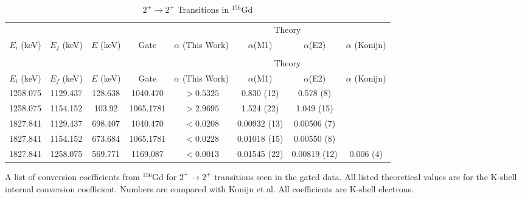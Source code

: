 \begin{landscape}
    \begin{longtable}{c|c|c|c|c|c|c|c}
        \caption{$2^+\rightarrow 2^+$ Transitions in $^{156}$Gd}
        \label{tab:156Gd_2_to_2}\\
        \toprule
        &	& 	&  &	& \multicolumn{2}{c|}{Theory}	& 	\\
        $E_i$ (keV)	&	$E_f$ (keV)	& $E$ (keV)	&	Gate &		$\alpha$ (This Work)	& $\alpha$(M1) & $\alpha$(E2) &	$\alpha$ (Konijn)	\\
        \hline
        \endfirsthead
        \toprule
        \caption[]{$2^+\rightarrow 2^+$ Transitions in $^{156}$Gd}\\
        &	& 	&  &	& \multicolumn{2}{c|}{Theory}	& 	\\
        $E_i$ (keV)	&	$E_f$ (keV)	& $E$ (keV)	&	Gate &		$\alpha$ (This Work)	& $\alpha$(M1) & $\alpha$(E2) &	$\alpha$ (Konijn)	\\
        \hline
	    \endhead
        1258.075 & 1129.437 & 128.638 & 1040.470 & $>0.5325$ & 0.830 (12) & 0.578 (8) &\\ \hline
        1258.075 & 1154.152 & 103.92 & 1065.1781 & $>2.9695$ & 1.524 (22)  & 1.049 (15) &\\ \hline
        1827.841 & 1129.437 & 698.407 & 1040.470 & $<0.0208$ & 0.00932 (13) & 0.00506 (7) & \\ \hline
        1827.841 & 1154.152 & 673.684 & 1065.1781 & $<0.0228$ & 0.01018 (15) & 0.00550 (8) &\\ \hline
        1827.841 & 1258.075 & 569.771 & 1169.087 & $<0.0013$ & 0.01545 (22) & 0.00819 (12) & 0.006 (4) \\
        \bottomrule
    \end{longtable}
    \caption{A list of conversion coefficients from $^{156}$Gd for $2^+\rightarrow 2^+$ transitions seen in the gated data. All listed theoretical values are for the K-shell internal conversion coefficient. Numbers are compared with Konijn et al.\citep{konjin81:_156gd} All coefficients are K-shell electrons.}
\end{landscape}